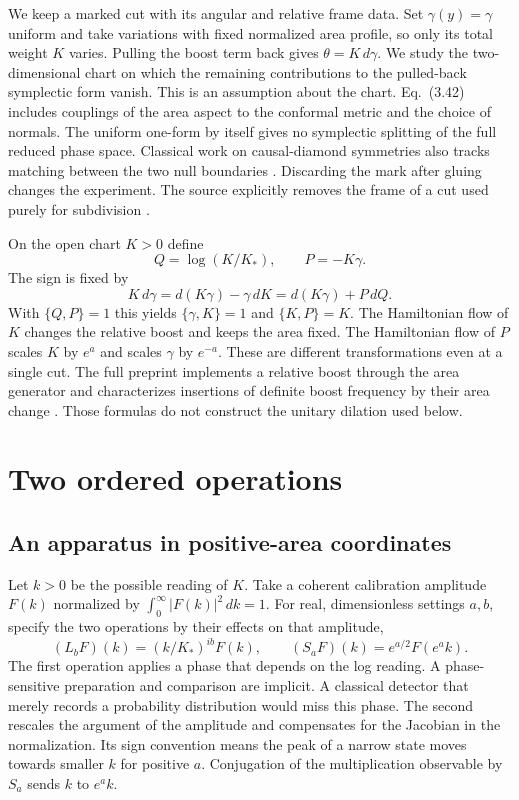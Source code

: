 \documentclass[11pt,letterpaper]{article}
\begin{document}
We keep a marked cut with its angular and relative frame data. Set $\gamma(y)=\gamma$ uniform and take variations with fixed normalized area profile, so only its total weight $K$ varies. Pulling the boost term back gives $\theta=K\,d\gamma$. We study the two-dimensional chart on which the remaining contributions to the pulled-back symplectic form vanish. This is an assumption about the chart. Eq.~(3.42) includes couplings of the area aspect to the conformal metric and the choice of normals. The uniform one-form by itself gives no symplectic splitting of the full reduced phase space. Classical work on causal-diamond symmetries also tracks matching between the two null boundaries \cite{cp}. Discarding the mark after gluing changes the experiment. The source explicitly removes the frame of a cut used purely for subdivision \cite[Sec.~3.6]{nc}.

On the open chart $K>0$ define
\begin{equation}
 Q=\log(K/K_*),\qquad P=-K\gamma .
 \label{eq:chart}
\end{equation}
The sign is fixed by
\[
 K\,d\gamma=d(K\gamma)-\gamma\,dK=d(K\gamma)+P\,dQ .
\]
With $\{Q,P\}=1$ this yields $\{\gamma,K\}=1$ and $\{K,P\}=K$. The Hamiltonian flow of $K$ changes the relative boost and keeps the area fixed. The Hamiltonian flow of $P$ scales $K$ by $e^a$ and scales $\gamma$ by $e^{-a}$. These are different transformations even at a single cut. The full preprint implements a relative boost through the area generator and characterizes insertions of definite boost frequency by their area change \cite[Eq.~(4.12)]{nc}. Those formulas do not construct the unitary dilation used below.

\section{Two ordered operations}

\subsection{An apparatus in positive-area coordinates}

Let $k>0$ be the possible reading of $K$. Take a coherent calibration amplitude $F(k)$ normalized by $\int_0^\infty |F(k)|^2\,dk=1$. For real, dimensionless settings $a,b$, specify the two operations by their effects on that amplitude,
\begin{equation}
 (L_bF)(k)=(k/K_*)^{ib}F(k),\qquad
 (S_aF)(k)=e^{a/2}F(e^ak).
 \label{eq:apparatus}
\end{equation}
The first operation applies a phase that depends on the log reading. A phase-sensitive preparation and comparison are implicit. A classical detector that merely records a probability distribution would miss this phase. The second rescales the argument of the amplitude and compensates for the Jacobian in the normalization. Its sign convention means the peak of a narrow state moves towards smaller $k$ for positive $a$. Conjugation of the multiplication observable by $S_a$ sends $k$ to $e^ak$.
\end{document}
